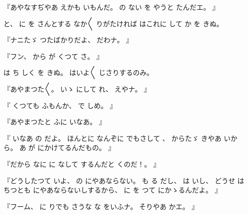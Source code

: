 『あやなすぢやあ
えかも
いもんだ。
%
の
ない
を
やうと
たんだエ。
』

と、
%
に
を
さんとする
なか〳〵
りがたければ
はこれに
して
か
を
きぬ。

『ナニたゞ
つたばかりだよ、
%
だわナ。
』

『フン、
%
から
が
くつて
さ。
』

は
ち
しく
を
きぬ。
%
はいよ〳〵
じさりするのみ。

『あやまつた〳〵。
%
いゝ
にして
れ、
%
えやナ。
』

『
くつても
ふもんか、
%
で
しめ。
』

『あやまつたと
ふに
いなあ。
』

『
いなあ
の
だよ。
%
ほんとに
なんぞに
でもさして
、
%
からたゞ
きやあ
いから。
%
あ
が
にかけてるんだもの。
』

『だから
なに
に
なして
するんだと
くのだ！。
』

『どうしたつて
いよ、
%
の
にやあならない。
%
も
る
だし、
%
は
いし、
%
どうせ
はちつとも
にやあならないしするから、
%
に
を
つて
にかゝるんだよ。
』

『フーム、
%
に
りでも
さうな
な
をいふナ。
%
そりやあ
かエ。
』

